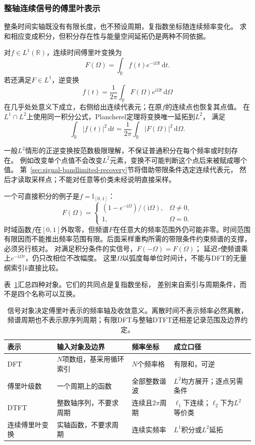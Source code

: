 \subsubsection{整轴连续信号的傅里叶表示}

整条时间实轴既没有有限长度，也不预设周期，复指数坐标随连续频率变化。
求和相应变成积分，但积分存在性与能量空间延拓仍是两种不同依据。
\begin{definition}[连续时间傅里叶变换]
  \label{def:signal-analysis-continuous-fourier-transform}
  对$f\in L^1(\mathbb R)$，连续时间傅里叶变换为
  \[
    F(\Omega)=\int_{\mathbb R}f(t)e^{-\mathrm i\Omega t}\,\mathrm dt.
  \]
  若还满足$F\in L^1$，逆变换
  \[
    f(t)=\frac1{2\pi}\int_{\mathbb R}F(\Omega)e^{\mathrm i\Omega t}\,\mathrm d\Omega
  \]
  在几乎处处意义下成立，右侧给出连续代表元；在原$f$的连续点也恢复其点值。
  在$L^1\cap L^2$上使用同一积分公式，Plancherel定理将变换唯一延拓到$L^2$，
  满足
  \[
    \int_{\mathbb R}|f(t)|^2\,\mathrm dt
    =\frac1{2\pi}\int_{\mathbb R}|F(\Omega)|^2\,\mathrm d\Omega.
  \]
\end{definition}
一般$L^2$情形的正逆变换按范数极限理解，不保证普通积分在每个频率或时刻存在。
例如改变单个点值不会改变$L^2$元素，变换不可能判断这个点后来被赋成哪个值。
第~\ref{sec:signal-bandlimited-recovery}节将借助带限条件选定连续代表元，
然后才读取采样点；不能对任意等价类未经说明直接采样。

一个可直接积分的例子是$f=\mathbb I_{[0,1]}$：
\[
  F(\Omega)=
  \begin{cases}
    (1-e^{-\mathrm i\Omega})/(\mathrm i\Omega),&\Omega\neq0,\\
    1,&\Omega=0.
  \end{cases}
\]
时域函数$f$在$[0,1]$外取零，但频谱$F$在任意大的频率范围外仍可能非零。时间范围
有限因而不能推出频率范围有限。后面采样重构所需的带限条件约束频谱的支撑，
必须另行核对。
对满足积分条件的实信号，$F(-\Omega)=\overline{F(\Omega)}$；
延迟$\tau$使频谱乘上$e^{-\mathrm i\Omega\tau}$，仍只改相位不改幅度。
这里$\Omega$以弧度每单位时间计，不能与DFT的无量纲索引$k$直接比较。

表~\ref{tab:reader-fourier-objects}汇总四种对象。它们的共同点是复指数坐标，
差别来自索引与周期条件，而不是四个名称可以互换。
\begin{table}[htbp]
  \centering
  \begin{tabularx}{\linewidth}{lXXX}
    \toprule
    表示 & 输入对象及边界 & 频率坐标 & 成立口径\\
    \midrule
    DFT & $N$项数组，基采用循环索引 & $N$个频率格 & 有限和，可逆\\
    傅里叶级数 & 一个周期上的函数 & 全部整数谐波 & $L^2$均方展开；逐点另需条件\\
    DTFT & 整数轴序列，不要求周期 & 连续且$2\pi$周期 & $\ell_1$下连续；$\ell_2$下为$L^2$等价类\\
    连续傅里叶变换 & 实轴函数，不要求周期 & 连续实频率 & $L^1$积分或$L^2$延拓\\
    \bottomrule
  \end{tabularx}
  \caption{信号对象决定傅里叶表示的频率轴及收敛意义。离散时间不表示频率必然离散，
  频谱周期也不表示原序列周期；有限DFT与整轴DTFT还相差记录范围及边界约定。}
  \label{tab:reader-fourier-objects}
\end{table}

